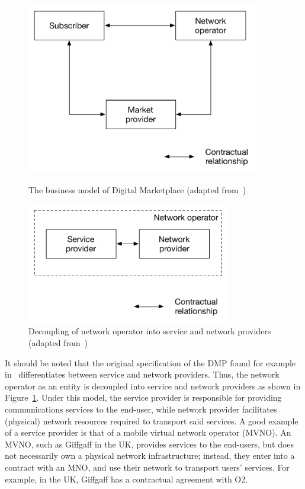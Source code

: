 \begin{figure}[p]
	\includegraphics[width=4in]{DMP/Figures/dmp_model}
	\caption{The business model of Digital Marketplace (adapted from~\cite{DMIrvine02})}
	\label{fig:dmp_model_dmp}
	\vspace{10mm}
	\includegraphics[width=3.5in]{DMP/Figures/no_decoupled}
	\caption{Decoupling of network operator into service and network providers (adapted from~\cite{DMIrvine02})}
	\label{fig:no_decoupled_dmp}
\end{figure}

It should be noted that the original specification of the DMP found for example in~\cite{DMLeBodic00,DMIrvine02,LeBodicThesis} differentiates between service and network providers. Thus, the network operator as an entity is decoupled into service and network providers as shown in Figure~\ref{fig:no_decoupled_dmp}. Under this model, the service provider is responsible for providing communications services to the end-user, while network provider facilitates (physical) network resources required to transport said services. A good example of a service provider is that of a mobile virtual network operator (MVNO). An MVNO, such as Giffgaff in the UK, provides services to the end-users, but does not necessarily own a physical network infrastructure; instead, they enter into a contract with an MNO, and use their network to transport users' services. For example, in the UK, Giffgaff has a contractual agreement with O2.

